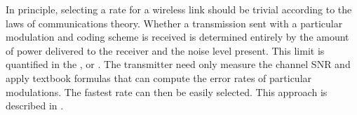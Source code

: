In principle, selecting a rate for a wireless link should be trivial according to the laws of communications theory. Whether a transmission sent with a particular modulation and coding scheme is received
is determined entirely by the amount of power delivered to the receiver and the noise level present. This limit is quantified in the , or .
The transmitter need only measure the channel SNR and apply textbook formulas that can compute the error rates of particular modulations. The fastest rate can then be easily selected. This approach is described in .

